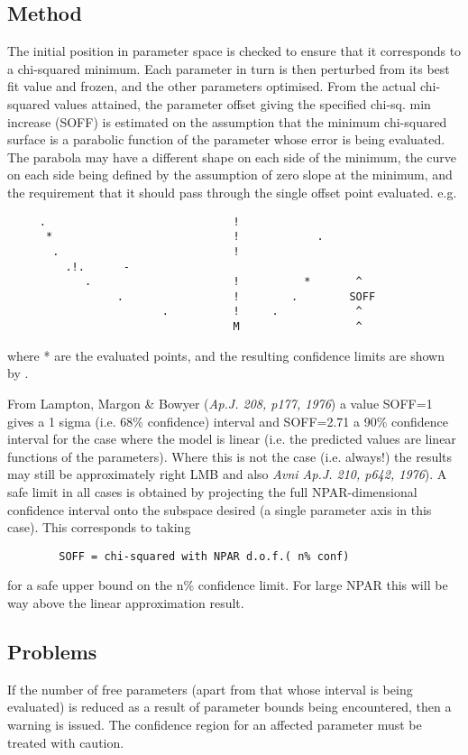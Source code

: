 \documentclass{book}
\renewcommand{\_}{{\tt\char'137}}     %
\begin{document}
\subsection{Method}
The initial position in parameter space is checked to ensure that
it corresponds to a chi-squared minimum. Each parameter in turn
is then perturbed from its best fit value and frozen, and the
other parameters optimised. From the actual chi-squared values
attained, the parameter offset giving the specified chi-sq. min
increase (SOFF) is estimated on the assumption that the minimum
chi-squared surface is a parabolic function of the parameter
whose error is being evaluated. The parabola may have a different
shape on each side of the minimum, the curve on each side being
defined by the assumption of zero slope at the minimum, and the
requirement that it should pass through the single offset point
evaluated. e.g.
\begin{verbatim}
     .                             !
      *                            !            .
       .                           !
         .!.      -
            .                      !          *       ^
                 .                 !        .        SOFF
                        .          !     .            ^
                                   M                  ^
  \end{verbatim}
where * are the evaluated points, and the resulting confidence
limits are shown by .

From Lampton, Margon \& Bowyer ({\em Ap.J. 208, p177, 1976}) a value
SOFF=1 gives a 1 sigma (i.e. 68\% confidence) interval and
SOFF=2.71 a 90\% confidence interval for the case where the model
is linear (i.e. the predicted values are linear functions of the
parameters). Where this is not the case (i.e. always!) the
results may still be approximately right LMB and also {\em Avni Ap.J.
210, p642, 1976}). A safe limit in all cases is obtained by
projecting the full NPAR-dimensional confidence interval onto the
subspace desired (a single parameter axis in this case). This
corresponds to taking

\begin{verbatim}
        SOFF = chi-squared with NPAR d.o.f.( n% conf)
\end{verbatim}
for a safe upper bound on the n\% confidence limit. For large NPAR
this will be way above the linear approximation result.

\subsection{Problems}
If the number of free parameters (apart from that whose interval
is being evaluated) is reduced as a result of parameter bounds
being encountered, then a warning is issued. The confidence
region for an affected parameter must be treated with caution.
\end{document}
